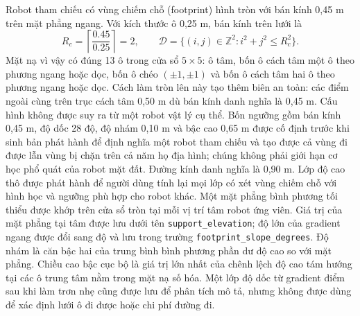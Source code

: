\documentclass[11pt]{article}
\begin{document}
Robot tham chiếu có vùng chiếm chỗ (footprint) hình tròn với bán kính 0,45 m
trên mặt phẳng ngang. Với kích thước ô 0,25 m, bán kính trên lưới là
\begin{equation}
  R_c=\left\lceil\frac{0.45}{0.25}\right\rceil=2,
  \qquad
  \mathcal{D}=\{(i,j)\in\mathbb{Z}^2:i^2+j^2\leq R_c^2\}.
\end{equation}
Mặt nạ vì vậy có đúng 13 ô trong cửa sổ $5\times5$: ô tâm, bốn ô cách tâm một
ô theo phương ngang hoặc dọc, bốn ô chéo $(\pm1,\pm1)$ và bốn ô cách tâm hai ô
theo phương ngang hoặc dọc. Cách làm tròn lên này tạo thêm biên an toàn: các điểm ngoài cùng trên
trục cách tâm 0,50 m dù bán kính danh nghĩa là 0,45 m. Cấu hình không được suy
ra từ một robot vật lý cụ thể. Bốn ngưỡng gồm bán kính 0,45 m, độ dốc 28 độ, độ nhám 0,10 m và bậc
cao 0,65 m được cố định trước khi sinh bản phát hành để định nghĩa một robot
tham chiếu và tạo được cả vùng đi được lẫn vùng bị chặn trên cả năm họ địa
hình; chúng không phải giới hạn cơ học phổ quát của robot mặt đất. Đường kính
danh nghĩa là 0,90 m. Lớp độ cao thô được phát hành để người dùng tính lại mọi
lớp có xét vùng chiếm chỗ
với hình học và ngưỡng phù hợp cho robot khác. Một mặt phẳng bình phương tối
thiểu được khớp trên cửa sổ tròn tại
mỗi vị trí tâm robot ứng viên. Giá trị của mặt phẳng tại tâm được lưu dưới tên
\texttt{support\_elevation}; độ lớn của gradient ngang được đổi sang độ và lưu
trong trường
\texttt{footprint\_slope\_degrees}. Độ nhám là căn bậc hai của trung bình bình phương
phần dư độ cao so với mặt phẳng. Chiều cao bậc cục bộ là giá trị lớn nhất của
chênh lệch độ cao tám hướng tại các ô trung tâm nằm trong mặt nạ số hóa. Một lớp độ dốc từ
gradient điểm sau khi làm trơn nhẹ cũng được lưu để phân tích mô tả, nhưng
không được dùng để xác định lưới ô đi được hoặc chi phí đường đi.
\end{document}
